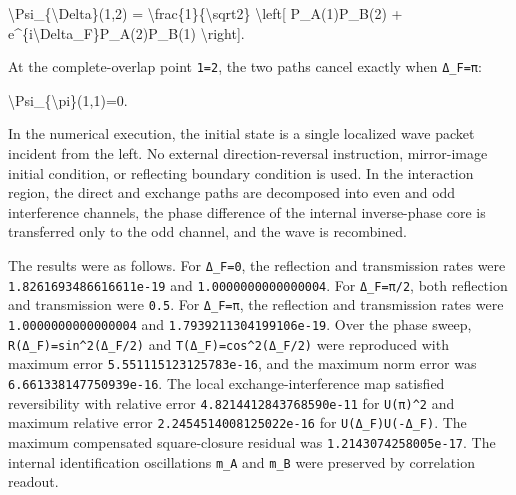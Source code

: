 \documentclass[
  a4paper,
]{article}
\newenvironment{Shaded}{}{}
\newcommand{\NormalTok}[1]{#1}
\begin{document}
\begin{Shaded}
\begin{Highlighting}[]
\NormalTok{\textbackslash{}Psi\_\{\textbackslash{}Delta\}(1,2)}
\NormalTok{=}
\NormalTok{\textbackslash{}frac\{1\}\{\textbackslash{}sqrt2\}}
\NormalTok{\textbackslash{}left[}
\NormalTok{P\_A(1)P\_B(2)}
\NormalTok{+}
\NormalTok{e\^{}\{i\textbackslash{}Delta\_F\}P\_A(2)P\_B(1)}
\NormalTok{\textbackslash{}right].}
\end{Highlighting}
\end{Shaded}

At the complete-overlap point \texttt{1=2}, the two paths cancel exactly
when \texttt{Δ\_F=π}:

\begin{Shaded}
\begin{Highlighting}[]
\NormalTok{\textbackslash{}Psi\_\{\textbackslash{}pi\}(1,1)=0.}
\end{Highlighting}
\end{Shaded}

In the numerical execution, the initial state is a single localized wave
packet incident from the left. No external direction-reversal
instruction, mirror-image initial condition, or reflecting boundary
condition is used. In the interaction region, the direct and exchange
paths are decomposed into even and odd interference channels, the phase
difference of the internal inverse-phase core is transferred only to the
odd channel, and the wave is recombined.

The results were as follows. For \texttt{Δ\_F=0}, the reflection and
transmission rates were \texttt{1.8261693486616611e-19} and
\texttt{1.0000000000000004}. For \texttt{Δ\_F=π/2}, both reflection and
transmission were \texttt{0.5}. For \texttt{Δ\_F=π}, the reflection and
transmission rates were \texttt{1.0000000000000004} and
\texttt{1.7939211304199106e-19}. Over the phase sweep,
\texttt{R(Δ\_F)=sin\^{}2(Δ\_F/2)} and \texttt{T(Δ\_F)=cos\^{}2(Δ\_F/2)}
were reproduced with maximum error \texttt{5.551115123125783e-16}, and
the maximum norm error was \texttt{6.661338147750939e-16}. The local
exchange-interference map satisfied reversibility with relative error
\texttt{4.8214412843768590e-11} for \texttt{U(π)\^{}2} and maximum
relative error \texttt{2.2454514008125022e-16} for
\texttt{U(Δ\_F)U(-Δ\_F)}. The maximum compensated square-closure
residual was \texttt{1.2143074258005e-17}. The internal identification
oscillations \texttt{m\_A} and \texttt{m\_B} were preserved by
correlation readout.
\end{document}
